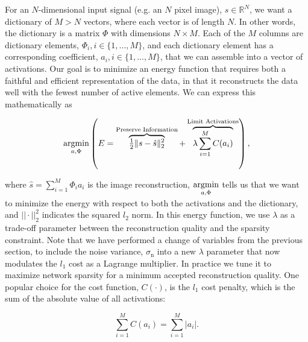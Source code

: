 For an $N$-dimensional input signal (e.g. an $N$ pixel image), $s \in \mathbb{R}^{N}$, we want a dictionary of $M > N$ vectors, where each vector is of length $N$. In other words, the dictionary is a matrix $\Phi$ with dimensions $N \times M$. Each of the $M$ columns are dictionary elements, $\Phi_{i}, i \in \{1,...,M\}$, and each dictionary element has a corresponding coefficient, $a_{i}, i \in \{1,...,M\}$, that we can assemble into a vector of activations. Our goal is to minimize an energy function that requires both a faithful and efficient representation of the data, in that it reconstructs the data well with the fewest number of active elements. We can express this mathematically as

\begin{equation}\label{eq:ch2_sparse_energy}
    \argmin\limits_{a, \Phi}
        \left( E =
            \overbrace{ \tfrac{1}{2} \| s - \hat{s} \|_{2}^{2} }^\text{Preserve Information} +
        \overbrace{ \lambda \sum\limits_{i=1}^{M}C(a_{i}) }^\text{Limit Activations} \right),
\end{equation}

\noindent where $\hat{s} = \sum\limits_{i=1}^{M}\Phi_{i}a_{i}$ is the image reconstruction, $\argmin\limits_{a, \Phi}$ tells us that we want to minimize the energy with respect to both the activations and the dictionary, and $||\cdot||_2^2$ indicates the squared $l_2$ norm. In this energy function, we use $\lambda$ as a trade-off parameter between the reconstruction quality and the sparsity constraint. Note that we have performed a change of variables from the previous section, to include the noise variance, $\sigma_{\text{n}}$ into a new $\lambda$ parameter that now modulates the $l_{1}$ cost as a Lagrange multiplier. In practice we tune it to maximize network sparsity for a minimum accepted reconstruction quality. One popular choice for the cost function, $C(\cdot)$, is the $l_{1}$ cost penalty, which is the sum of the absolute value of all activations:

\begin{equation}\label{eq:ch2_l1_cost}
  \sum\limits_{i=1}^{M}C(a_{i}) = \sum\limits_{i=1}^{M}|a_{i}|.
\end{equation}

